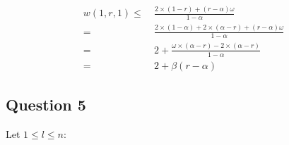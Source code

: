 \documentclass{Cours}
\begin{document}
\begin{itemize}
\[\begin{aligned}
                        w(1, r, 1)  \leq &\ \frac{2 \times \left(1 - r\right) + \left(r - \alpha\right)\omega}{1 - \alpha}\\
                        = &\ \frac{2 \times \left(1 - \alpha\right) + 2 \times \left(\alpha - r\right) + \left(r - \alpha\right) \omega}{1 - \alpha}\\
                        = &\ 2 + \frac{\omega \times \left(\alpha - r\right) - 2 \times \left(\alpha - r\right)}{1 - \alpha}\\
                        = &\ 2 + \beta(r - \alpha)
                    \end{aligned}
                \]
            \end{itemize}
            
            
        \subsection{Question 5}
            Let $1 \leq l \leq n$:
\end{document}
